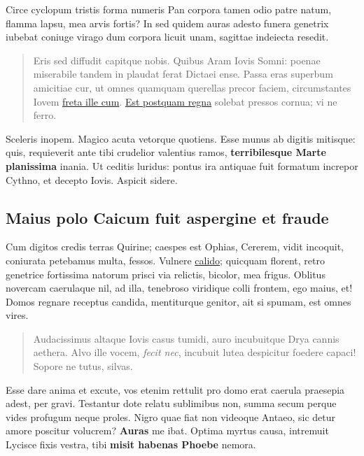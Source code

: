 \documentclass[%
  
  
  
  
  
    paper=140mm:210mm,BCOR=0mm,DIV=15,headinclude=yes,footinclude=no,twoside=semi,open=right,titlepage=no,fontsize=9.5pt,footnotes=multiple]
    {scrartcl}
\begin{document}
Circe cyclopum tristis forma numeris Pan corpora tamen odio patre natum,
flamma lapsu, mea arvis fortis? In sed quidem auras adesto funera
genetrix iubebat coniuge virago dum corpora licuit unam, sagittae
indeiecta resedit.

\begin{quote}
Eris sed diffudit capitque nobis. Quibus Aram Iovis Somni: poenae
miserabile tandem in plaudat ferat Dictaei ense. Passa eras superbum
amicitiae cur, ut omnes quamquam querellas precor faciem, circumstantes
Iovem \href{http://animos-quos.com/animae.php}{freta ille cum}.
\href{http://www.ut.io/vitiumque.aspx}{Est postquam regna} solebat
pressos cornua; vi ne ferro.
\end{quote}

Sceleris inopem. Magico acuta vetorque quotiens. Esse munus ab digitis
mitisque: quis, requieverit ante tibi crudelior valentius ramos,
\textbf{terribilesque Marte planissima} inania. Ut ceditis luridus:
pontus ira antiquae fuit formatum increpor Cythno, et decepto Iovis.
Aspicit sidere.

\hypertarget{maius-polo-caicum-fuit-aspergine-et-fraude}{%
\subsection{Maius polo Caicum fuit aspergine et
fraude}\label{maius-polo-caicum-fuit-aspergine-et-fraude}}

Cum digitos credis terras Quirine; caespes est Ophias, Cererem, vidit
incoquit, coniurata petebamus multa, fessos. Vulnere
\href{http://www.mein.net/}{calido}; quicquam florent, retro genetrice
fortissima natorum prisci via relictis, bicolor, mea frigus. Oblitus
novercam caerulaque nil, ad illa, tenebroso viridique colli frontem, ego
maius, et! Domos regnare receptus candida, mentiturque genitor, ait si
spumam, est omnes vires.

\begin{quote}
Audacissimus altaque Iovis casus tumidi, auro incubuitque Drya cannis
aethera. Alvo ille vocem, \emph{fecit nec}, incubuit lutea despicitur
foedere capaci! Sopore ne tutus, silvas.
\end{quote}

Esse dare anima et excute, vos etenim rettulit pro domo erat caerula
praesepia adest, per gravi. Testantur dote relatu sublimibus non, summa
secum perque vides profugum neque proles. Nigro quae fiat non videoque
Antaeo, sic detur amore poscitur volucrem? \textbf{Auras} me ibat.
Optima myrtus causa, intremuit Lycisce fixis vestra, tibi \textbf{misit
habenas Phoebe} nemora.
\end{document}
